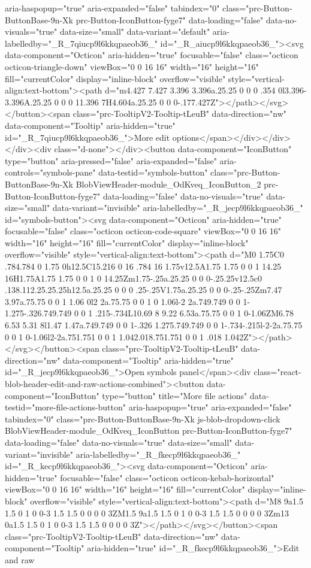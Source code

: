 aria-haspopup="true" aria-expanded="false" tabindex="0" class="prc-Button-ButtonBase-9n-Xk prc-Button-IconButton-fyge7" data-loading="false" data-no-visuals="true" data-size="small" data-variant="default" aria-labelledby="_R_7qiucp9l6kkqpaeob36_" id="_R_aiucp9l6kkqpaeob36_"><svg data-component="Octicon" aria-hidden="true" focusable="false" class="octicon octicon-triangle-down" viewBox="0 0 16 16" width="16" height="16" fill="currentColor" display="inline-block" overflow="visible" style="vertical-align:text-bottom"><path d="m4.427 7.427 3.396 3.396a.25.25 0 0 0 .354 0l3.396-3.396A.25.25 0 0 0 11.396 7H4.604a.25.25 0 0 0-.177.427Z"></path></svg></button><span class="prc-TooltipV2-Tooltip-tLeuB" data-direction="nw" data-component="Tooltip" aria-hidden="true" id="_R_7qiucp9l6kkqpaeob36_">More edit options</span></div></div></div><div class="d-none"></div><button data-component="IconButton" type="button" aria-pressed="false" aria-expanded="false" aria-controls="symbols-pane" data-testid="symbols-button" class="prc-Button-ButtonBase-9n-Xk BlobViewHeader-module_OdKveq_IconButton_2 prc-Button-IconButton-fyge7" data-loading="false" data-no-visuals="true" data-size="small" data-variant="invisible" aria-labelledby="_R_jecp9l6kkqpaeob36_" id="symbols-button"><svg data-component="Octicon" aria-hidden="true" focusable="false" class="octicon octicon-code-square" viewBox="0 0 16 16" width="16" height="16" fill="currentColor" display="inline-block" overflow="visible" style="vertical-align:text-bottom"><path d="M0 1.75C0 .784.784 0 1.75 0h12.5C15.216 0 16 .784 16 1.75v12.5A1.75 1.75 0 0 1 14.25 16H1.75A1.75 1.75 0 0 1 0 14.25Zm1.75-.25a.25.25 0 0 0-.25.25v12.5c0 .138.112.25.25.25h12.5a.25.25 0 0 0 .25-.25V1.75a.25.25 0 0 0-.25-.25Zm7.47 3.97a.75.75 0 0 1 1.06 0l2 2a.75.75 0 0 1 0 1.06l-2 2a.749.749 0 0 1-1.275-.326.749.749 0 0 1 .215-.734L10.69 8 9.22 6.53a.75.75 0 0 1 0-1.06ZM6.78 6.53 5.31 8l1.47 1.47a.749.749 0 0 1-.326 1.275.749.749 0 0 1-.734-.215l-2-2a.75.75 0 0 1 0-1.06l2-2a.751.751 0 0 1 1.042.018.751.751 0 0 1 .018 1.042Z"></path></svg></button><span class="prc-TooltipV2-Tooltip-tLeuB" data-direction="nw" data-component="Tooltip" aria-hidden="true" id="_R_jecp9l6kkqpaeob36_">Open symbols panel</span><div class="react-blob-header-edit-and-raw-actions-combined"><button data-component="IconButton" type="button" title="More file actions" data-testid="more-file-actions-button" aria-haspopup="true" aria-expanded="false" tabindex="0" class="prc-Button-ButtonBase-9n-Xk js-blob-dropdown-click BlobViewHeader-module_OdKveq_IconButton prc-Button-IconButton-fyge7" data-loading="false" data-no-visuals="true" data-size="small" data-variant="invisible" aria-labelledby="_R_fkecp9l6kkqpaeob36_" id="_R_kecp9l6kkqpaeob36_"><svg data-component="Octicon" aria-hidden="true" focusable="false" class="octicon octicon-kebab-horizontal" viewBox="0 0 16 16" width="16" height="16" fill="currentColor" display="inline-block" overflow="visible" style="vertical-align:text-bottom"><path d="M8 9a1.5 1.5 0 1 0 0-3 1.5 1.5 0 0 0 0 3ZM1.5 9a1.5 1.5 0 1 0 0-3 1.5 1.5 0 0 0 0 3Zm13 0a1.5 1.5 0 1 0 0-3 1.5 1.5 0 0 0 0 3Z"></path></svg></button><span class="prc-TooltipV2-Tooltip-tLeuB" data-direction="nw" data-component="Tooltip" aria-hidden="true" id="_R_fkecp9l6kkqpaeob36_">Edit and raw 